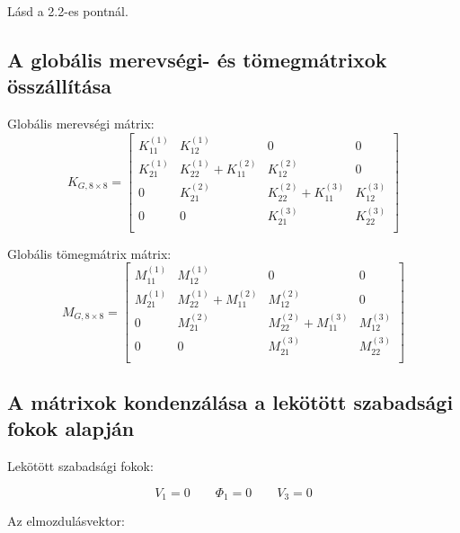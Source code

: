 \documentclass{article}
\begin{document}
		Lásd a 2.2-es pontnál.
	
		\subsection{A globális merevségi- és tömegmátrixok összállítása}
		
			Globális merevségi mátrix:
			\begin{equation}
				K_{G,8\times8}=
				\begin{bmatrix}
				K_{11}^{(1)} & K_{12}^{(1)}              & 0            			    & 0            \\
				K_{21}^{(1)} & K_{22}^{(1)}+K_{11}^{(2)} & K_{12}^{(2)}  			    & 0            \\
				0            & K_{21}^{(2)}              & K_{22}^{(2)} + K_{11}^{(3)}  & K_{12}^{(3)} \\
				0            & 0						 & K_{21}^{(3)} 					& K_{22}^{(3)} \\
				\end{bmatrix}
			\end{equation}
			
			Globális tömegmátrix mátrix:
			\begin{equation}
			M_{G,8\times8}=
			\begin{bmatrix}
			M_{11}^{(1)} & M_{12}^{(1)}              & 0            			    & 0            \\
			M_{21}^{(1)} & M_{22}^{(1)}+M_{11}^{(2)} & M_{12}^{(2)}  			    & 0            \\
			0            & M_{21}^{(2)}              & M_{22}^{(2)} + M_{11}^{(3)}  & M_{12}^{(3)} \\
			0            & 0						 & M_{21}^{(3)} 					& M_{22}^{(3)} \\
			\end{bmatrix}
			\end{equation}
	
	
		\subsection{A mátrixok kondenzálása a lekötött szabadsági fokok alapján}
		
			Lekötött szabadsági fokok:
			
			\[V_{1}=0 \qquad \Phi_{1}=0 \qquad V_{3}=0\]	
			
			Az elmozdulásvektor:
			
\end{document}
